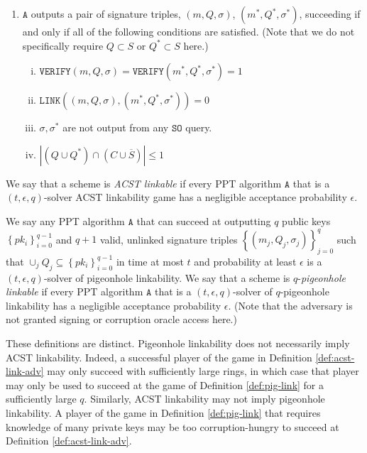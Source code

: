 \documentclass{llncs}
\newcommand{\A}{\texttt{A}}
\begin{document}
\begin{definition}
\begin{enumerate}
\item $\A$ outputs a pair of signature triples, $(m, Q, \sigma)$, $(m^*, Q^*, \sigma^*)$, succeeding if and only if all of the following conditions are satisfied. (Note that we do not specifically require $Q \subset S$ or $Q^* \subset S$ here.)
    \begin{enumerate}[(i)]
        \item $\texttt{VERIFY}(m, Q, \sigma) = \texttt{VERIFY}(m^*, Q^*, \sigma^*) = 1$
        \item $\texttt{LINK}((m, Q, \sigma), (m^*, Q^*, \sigma^*)) = 0$
        \item $\sigma, \sigma^*$ are not output from any $\texttt{SO}$ query.
        \item $\left|(Q \cup Q^* ) \cap (C \cup \overline{S})\right| \leq 1$
    \end{enumerate}
\end{enumerate}
We say that a scheme is \textit{ACST linkable} if every PPT algorithm $\A$ that is a $(t, \epsilon, q)$-solver ACST linkability game has a negligible acceptance probability $\epsilon$.
\end{definition}

\begin{definition}\label{def:pig-link}
We say any PPT algorithm $\A$ that can succeed at outputting $q$ public keys $\left\{pk_i\right\}_{i=0}^{q-1}$ and $q + 1$ valid, unlinked signature triples $\left\{(m_j, Q_j, \sigma_j)\right\}_{j=0}^{q}$ such that $\cup_j Q_j \subseteq \left\{pk_i\right\}_{i=0}^{q-1}$ in time at most $t$ and probability at least $\epsilon$ is a $(t, \epsilon, q)$-solver of pigeonhole linkability. We say that a scheme is $q$-\textit{pigeonhole linkable} if every PPT algorithm $\A$ that is a $(t, \epsilon, q)$-solver of $q$-pigeonhole linkability has a negligible acceptance probability $\epsilon$. (Note that the adversary is not granted signing or corruption oracle access here.)
\end{definition}

These definitions are distinct. Pigeonhole linkability does not necessarily imply ACST linkability. Indeed, a successful player of the game in Definition \ref{def:acst-link-adv} may only succeed with sufficiently large rings, in which case that player may only be used to succeed at the game of Definition \ref{def:pig-link} for a sufficiently large $q$. Similarly, ACST linkability may not imply pigeonhole linkability. A player of the game in Definition \ref{def:pig-link} that requires knowledge of many private keys may be too corruption-hungry to succeed at Definition \ref{def:acst-link-adv}.
\end{document}
